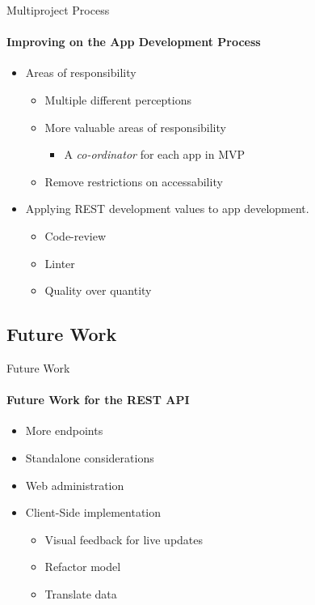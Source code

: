     \begin{frame}[t]{Multiproject Process}\framesubtitle{Improving on the App Development Process}
        \begin{itemize}
            \item Areas of responsibility
            \begin{itemize}
                \item Multiple different perceptions
                \item More valuable areas of responsibility
                \begin{itemize}
                    \item A \textit{co-ordinator} for each app in MVP
                \end{itemize}
                \item Remove restrictions on accessability
            \end{itemize}
            \bigskip
            \item Applying REST development values to app development.
            \begin{itemize}
                \item Code-review
                \item Linter
                \item Quality over quantity
            \end{itemize}
        \end{itemize}
    \end{frame}

    \subsection{Future Work}
    \begin{frame}[t]{Future Work}\framesubtitle{Future Work for the REST API}
        \begin{itemize}
            \item More endpoints
            \item Standalone considerations
            \item Web administration
            \item Client-Side implementation
            \begin{itemize}
                \item Visual feedback for live updates
                \item Refactor model
                \item Translate data
            \end{itemize}
        \end{itemize}
    \end{frame}
